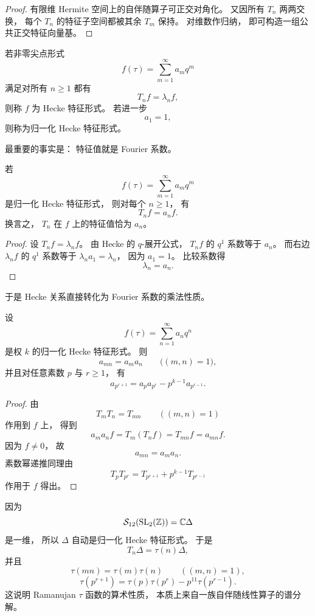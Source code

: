\begin{proof} 有限维 Hermite 空间上的自伴随算子可正交对角化。 又因所有 $T_n$ 两两交换， 每个 $T_n$ 的特征子空间都被其余 $T_m$ 保持。 对维数作归纳， 即可构造一组公共正交特征向量基。 \end{proof}




\begin{definition} 若非零尖点形式 \[ f(\tau)=\sum_{m=1}^\infty a_m q^m \] 满足对所有 $n\ge1$ 都有 \[ T_n f=\lambda_n f, \] 则称 $f$ 为 Hecke 特征形式。 若进一步 \[ a_1=1, \] 则称为归一化 Hecke 特征形式。 \end{definition} 最重要的事实是： 特征值就是 Fourier 系数。




\begin{proposition} 若 \[ f(\tau)=\sum_{m=1}^\infty a_m q^m \] 是归一化 Hecke 特征形式， 则对每个 $n\ge1$， 有 \[ T_n f=a_n f. \] 换言之， $T_n$ 在 $f$ 上的特征值恰为 $a_n$。 \end{proposition}




\begin{proof} 设 $T_n f=\lambda_n f$。 由 Hecke 的 $q$-展开公式， $T_n f$ 的 $q^1$ 系数等于 $a_n$。 而右边 $\lambda_n f$ 的 $q^1$ 系数等于 $\lambda_n a_1=\lambda_n$， 因为 $a_1=1$。 比较系数得 \[ \lambda_n=a_n. \] \end{proof} 于是 Hecke 关系直接转化为 Fourier 系数的乘法性质。




\begin{theorem}[乘性与素数幂递推] 设 \[ f(\tau)=\sum_{n=1}^\infty a_n q^n \] 是权 $k$ 的归一化 Hecke 特征形式。 则 \[ a_{mn}=a_ma_n\qquad \bigl((m,n)=1\bigr), \] 并且对任意素数 $p$ 与 $r\ge1$， 有 \[ a_{p^{r+1}}=a_p a_{p^r}-p^{k-1}a_{p^{r-1}}. \] \end{theorem}




\begin{proof} 由 \[ T_mT_n=T_{mn}\qquad ((m,n)=1) \] 作用到 $f$ 上， 得到 \[ a_ma_n f=T_m(T_n f)=T_{mn}f=a_{mn}f. \] 因为 $f\ne0$， 故 \[ a_{mn}=a_ma_n. \] 素数幂递推同理由 \[ T_pT_{p^r}=T_{p^{r+1}}+p^{k-1}T_{p^{r-1}} \] 作用于 $f$ 得出。 \end{proof}




\begin{example} 因为 \[ \mathcal{S}_{12}(\mathrm{SL}_2(\mathbb{Z}))=\mathbb{C}\Delta \] 是一维， 所以 $\Delta$ 自动是归一化 Hecke 特征形式。 于是 \[ T_n\Delta=\tau(n)\Delta, \] 并且 \[ \tau(mn)=\tau(m)\tau(n)\qquad ((m,n)=1), \] \[ \tau(p^{r+1})=\tau(p)\tau(p^r)-p^{11}\tau(p^{r-1}). \] 这说明 Ramanujan $\tau$ 函数的算术性质， 本质上来自一族自伴随线性算子的谱分解。 \end{example}




